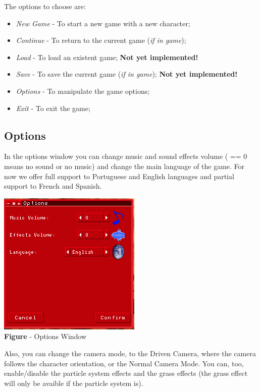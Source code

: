 \documentclass[ letterpaper,12pt]{article}
\begin{document}
The options to choose are:

\begin{itemize}
\item{{\it New Game} - To start a new game with a new character;}
\item{{\it Continue} - To return to the current game ({\it if in game});}
\item{{\it Load} - To load an existent game; {\bf Not yet implemented!}}
\item{{\it Save} - To save the current game ({\it if in game}); {\bf Not yet implemented!}}
\item{{\it Options} - To manipulate the game options;}
\item{{\it Exit} - To exit the game;}
\end{itemize}

\subsection{Options}

In the options window you can change music and sound effects volume ( == 0
means no sound or no music) and change the main language of the game. For now
we offer full support to Portuguese and English languages and partial support
to French and Spanish.

\begin{center}
  \includegraphics{optionsWindow.png}
\\{\bf Figure} - Options Window
\end{center}

Also, you can change the camera mode, to the Driven Camera, where the camera
follows the character orientation, or the Normal Camera Mode. You can, too,
enable/disable the particle system effects and the grass effects (the grass
effect will only be avaible if the particle system is).
\end{document}
